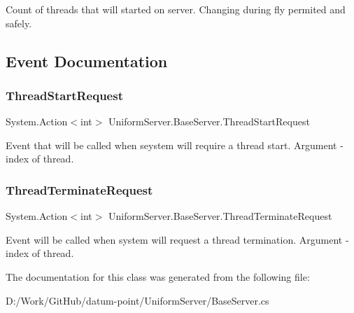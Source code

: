 Count of threads that will started on server. Changing during fly permited and safely. 



\subsection{Event Documentation}
\mbox{\label{class_uniform_server_1_1_base_server_a440a854a955ab7c5e563918c12e9b32c}} 
\subsubsection{\texorpdfstring{Thread\+Start\+Request}{ThreadStartRequest}}
{\footnotesize\ttfamily System.\+Action$<$int$>$ Uniform\+Server.\+Base\+Server.\+Thread\+Start\+Request\hspace{0.3cm}{\ttfamily [static]}}



Event that will be called when seystem will require a thread start. Argument -\/ index of thread. 

\mbox{\label{class_uniform_server_1_1_base_server_a889c3aaa1cca7f4a9a4e32617516f4be}} 
\subsubsection{\texorpdfstring{Thread\+Terminate\+Request}{ThreadTerminateRequest}}
{\footnotesize\ttfamily System.\+Action$<$int$>$ Uniform\+Server.\+Base\+Server.\+Thread\+Terminate\+Request\hspace{0.3cm}{\ttfamily [static]}}



Event will be called when system will request a thread termination. Argument -\/ index of thread. 



The documentation for this class was generated from the following file\+:\begin{DoxyCompactItemize}
\item 
D\+:/\+Work/\+Git\+Hub/datum-\/point/\+Uniform\+Server/Base\+Server.\+cs\end{DoxyCompactItemize}

